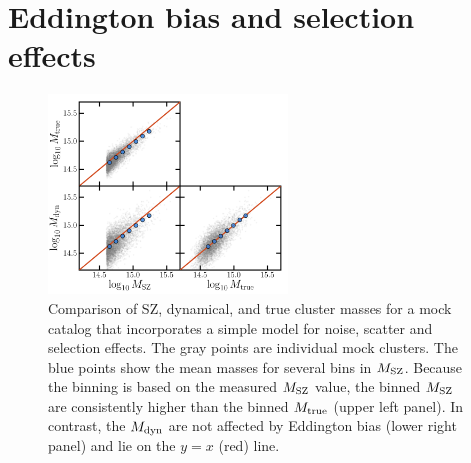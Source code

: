 % 
% 


% 
% 


\setcounter{section}{0}
\renewcommand\thesection{\arabic{chapter}.\Alph{section}}

\section{Eddington bias and selection effects}
\label{ap:bias}

\begin{figure}
\begin{minipage}[b]{2.5in}
 \centerline{\includegraphics[width=2.5in]{chapter3/figure_a1.pdf}}
\end{minipage}
\begin{minipage}[b]{2.3in}
\caption{Comparison of SZ, dynamical, and true cluster masses for a mock catalog that incorporates 
a simple model for noise, scatter and selection effects.  The gray points are individual mock 
clusters. The blue points show the mean masses for several bins in $M_{\rm SZ}$. Because the 
binning is based on the measured $M_{\rm SZ}$ value, the binned $M_{\rm SZ}$ are consistently 
higher than the binned $M_{\rm true}$ (upper left panel).  In contrast, the $M_{\rm dyn}$ are not 
affected by Eddington bias (lower right panel) and lie on the $y=x$ (red) line.}
\label{f:appendix_a1}
\end{minipage}
\end{figure}

